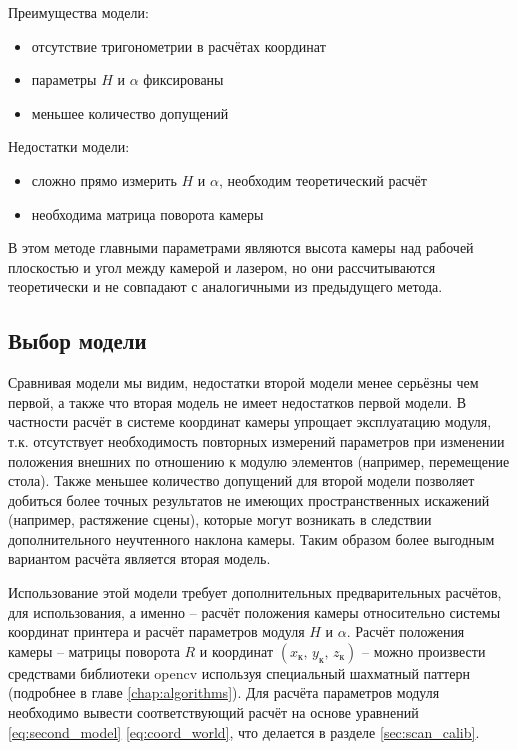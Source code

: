            Преимущества модели:
            \begin{itemize}
                \item отсутствие тригонометрии в расчётах координат
                \item параметры $ H $ и $ \alpha $ фиксированы
                \item меньшее количество допущений
            \end{itemize}
            
            Недостатки модели:
            \begin{itemize}
                \item сложно прямо измерить $ H $ и $ \alpha $, необходим теоретический расчёт
                \item необходима матрица поворота камеры
            \end{itemize}
            
            В этом методе главными параметрами являются высота камеры над рабочей плоскостью и угол между камерой и лазером, но они рассчитываются теоретически и не совпадают с аналогичными из предыдущего метода.
        \subsection{Выбор модели}
            Сравнивая модели мы видим, недостатки второй модели менее серьёзны чем первой, а также что вторая модель не имеет недостатков первой модели. В частности расчёт в системе координат камеры упрощает эксплуатацию модуля, т.к. отсутствует необходимость повторных измерений параметров при изменении положения внешних по отношению к модулю элементов (например, перемещение стола). Также меньшее количество допущений для второй модели позволяет добиться более точных результатов не имеющих пространственных искажений (например, растяжение сцены), которые могут возникать в следствии дополнительного неучтенного наклона камеры.
            Таким образом более выгодным вариантом расчёта является вторая модель.
            
            \sloppy Использование этой модели требует дополнительных предварительных расчётов, для использования, а именно -- расчёт положения камеры относительно системы координат принтера и расчёт параметров модуля $ H $ и $\alpha$. Расчёт положения камеры -- матрицы поворота $ R $ и координат $ \left(x_\text{к},\,y_\text{к},\,z_\text{к}\right) $ -- можно произвести средствами библиотеки opencv используя специальный шахматный паттерн (подробнее в главе \ref{chap:algorithms}). Для расчёта параметров модуля необходимо вывести соответствующий расчёт на основе уравнений \ref{eq:second_model} \ref{eq:coord_world}, что делается в разделе \ref{sec:scan_calib}.


